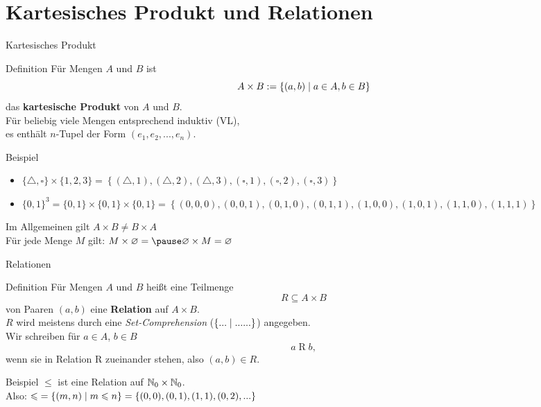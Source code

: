 \section{Kartesisches Produkt und Relationen}

\begin{frame}{Kartesisches Produkt}
	\begin{block}{Definition}
		Für Mengen $A$ und $B$ ist
		$$A \times B := \left\{ (a,b) \;\middle|\; a \in A, b \in B \right\}$$
		das \textbf{kartesische Produkt} von $A$ und $B$. \\
		\impl Für beliebig viele Mengen entsprechend induktiv (VL), \\
		es enthält $n$-Tupel der Form $(e_1, e_2, ..., e_n)$.
	\end{block}

	\pause
	\begin{exampleblock}{Beispiel}
		\begin{itemize}
			\item $\{\triangle,\square\} \times \{1, 2, 3\} = \left\{(\triangle, 1), (\triangle, 2), (\triangle, 3), (\square, 1), (\square, 2), (\square, 3)\right\}$ 
			\item 	$\{0, 1\}^3 = \{0,1\} \times \{0,1\} \times \{0,1\} = \left\{(0, 0, 0), (0, 0, 1), (0, 1, 0), (0, 1, 1), (1, 0, 0), (1, 0, 1), (1, 1, 0), (1, 1, 1)\right\} $
		\end{itemize}
		
		\pause
	   Im Allgemeinen gilt $ A \times B \neq B \times A $\\
	   Für jede Menge $M$ gilt: $ M \times \emptyset = \pause \emptyset \times M = \emptyset$
	\end{exampleblock}
\end{frame}

\begin{frame}{Relationen}
	\begin{block}{Definition}
		Für Mengen $A$ und $B$ heißt eine Teilmenge 
		$$R \subseteq A \times B$$
		von Paaren $(a,b)$ eine \textbf{Relation} auf $A \times B$. \\
		\smallskip
		$R$ wird meistens durch eine \emph{Set-Comprehension} ($\left\{... \vphantom{(} \;\middle|\; ......\right\}$) angegeben. \\
		\smallskip
		Wir schreiben für $a \in A$, $b \in B$ 
		$$a \mathrel{R} b, $$
		wenn sie in Relation R zueinander stehen, also $(a, b) \in R$.
	\end{block}
	
	\pause
	\begin{exampleblock}{Beispiel} 
		$\leq$ ist eine Relation auf $\mathbb{N}_0 \times \mathbb{N}_0 $. \\
		Also: $ \text{$\leqslant$} = \left\{(m, n) \;\middle|\; m \leqslant n \right\} = \{(0, 0), (0, 1), (1, 1), (0, 2), ...\} $
	\end{exampleblock}
\end{frame}

